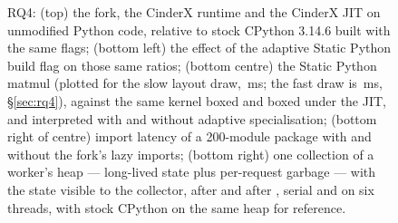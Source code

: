 \begin{figure}[t]
  \centering
  \caption{RQ4: (top) the fork, the CinderX runtime and the CinderX JIT on unmodified
    Python code, relative to stock CPython 3.14.6 built with the same flags; (bottom left) the
    effect of the adaptive Static Python build flag on those same ratios; (bottom centre) the
    Static Python  matmul (plotted for the slow layout draw, \,ms; the fast draw
    is \,ms, \S\ref{sec:rq4}), against the same kernel boxed and boxed under the JIT,
    and interpreted with and without adaptive specialisation; (bottom right of centre) import
    latency of a 200-module package with and
    without the fork's lazy imports; (bottom right) one collection of a worker's heap ---
    long-lived state plus per-request garbage --- with the state visible to the collector,
    after  and after , serial and on six threads,
    with stock CPython on the same heap for reference.}
  \label{fig:cinder}
\end{figure}

\begin{table}[t]
  \centering
  \caption{RQ4: what the open CinderX actually delivers, built and run natively on the host of
    Table~\ref{tab:platform}.}
  \label{tab:cinder}
  \small
  
\end{table}

